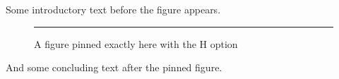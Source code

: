 \documentclass{article}
\begin{document}
Some introductory text before the figure appears.
\begin{figure}[H]
\centering
\rule{5cm}{2cm}
\caption{A figure pinned exactly here with the H option}
\end{figure}
And some concluding text after the pinned figure.
\end{document}
